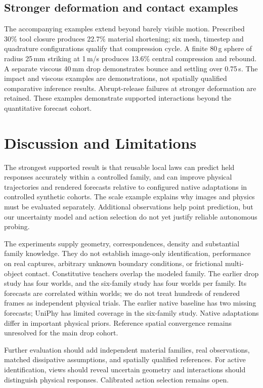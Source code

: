 \documentclass[10pt,twocolumn,letterpaper]{article}
\begin{document}
\subsection{Stronger deformation and contact examples}
The accompanying examples extend beyond barely visible motion. Prescribed 30\% tool closure produces 22.7\% material shortening; six mesh, timestep and quadrature configurations qualify that compression cycle. A finite 80\,g sphere of radius 25\,mm striking at 1\,m/s produces 13.6\% central compression and rebound. A separate viscous 40\,mm drop demonstrates bounce and settling over 0.75\,s. The impact and viscous examples are demonstrations, not spatially qualified comparative inference results. Abrupt-release failures at stronger deformation are retained. These examples demonstrate supported interactions beyond the quantitative forecast cohort.



\section{Discussion and Limitations}
The strongest supported result is that reusable local laws can predict held responses accurately within a controlled family, and can improve physical trajectories and rendered forecasts relative to configured native adaptations in controlled synthetic cohorts. The scale example explains why images and physics must be evaluated separately. Additional observations help point prediction, but our uncertainty model and action selection do not yet justify reliable autonomous probing.

The experiments supply geometry, correspondences, density and substantial family knowledge. They do not establish image-only identification, performance on real captures, arbitrary unknown boundary conditions, or frictional multi-object contact. Constitutive teachers overlap the modeled family. The earlier drop study has four worlds, and the six-family study has four worlds per family. Its forecasts are correlated within worlds; we do not treat hundreds of rendered frames as independent physical trials. The earlier native baseline has two missing forecasts; UniPhy has limited coverage in the six-family study. Native adaptations differ in important physical priors. Reference spatial convergence remains unresolved for the main drop cohort.

Further evaluation should add independent material families, real observations, matched dissipative assumptions, and spatially qualified references. For active identification, views should reveal uncertain geometry and interactions should distinguish physical responses. Calibrated action selection remains open.
\end{document}
